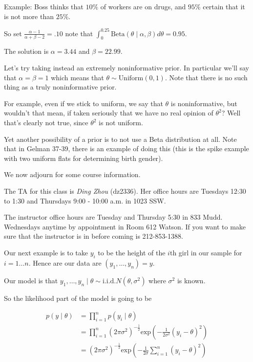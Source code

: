 \documentclass[a4paper]{article}
\begin{document}
Example: Boss thinks that $10\%$ of workers are on drugs, and $95\%$ certain that it is not more than $25\%$.

So set $\frac{\alpha - 1}{\alpha + \beta - 2} = .10$ note that $\int _0 ^{0.25} \text{Beta}(\theta \mid \alpha, \beta) d\theta = 0.95$.

The solution is $\alpha = 3.44$ and $\beta = 22.99$.

Let's try taking instead an extremely noninformative prior. In particular we'll
say that $\alpha = \beta = 1$ which means that $\theta \sim \text{Uniform}(0,
1)$. Note that there is no such thing as a truly noninformative prior.

For example, even if we stick to uniform, we say that $\theta$ is
noninformative, but wouldn't that mean, if taken seriously that we have no real
opinion of $\theta ^2$? Well that's clearly not true, since $\theta ^2$ is not
uniform. 

Yet another possibility of a prior is to not use a Beta distribution at all.
Note that in Gelman 37-39, there is an example of doing this (this is the spike
example with two uniform flats for determining birth gender).

We now adjourn for some course information.

The TA for this class is \emph{Ding Zhou} (dz2336). Her office hours are
Tuesdays 12:30 to 1:30 and Thursdays 9:00 - 10:00 a.m. in 1023 SSW.

The instructor office hours are Tuesday and Thursday 5:30 in 833 Mudd.
Wednesdays anytime by appointment in Room 612 Watson. If you want to make sure
that the instructor is in before coming is 212-853-1388.

Our next example is to take $y_i$ to be the height of the $i$th girl in our
sample for $i = 1 \ldots n$. Hence are our data are $\left( y_1, \ldots, y_n
\right) = y$.

Our model is that $y_1, \ldots, y_n \mid \theta \sim \text{i.i.d.} N\left(
\theta, \sigma ^2 \right)$ where $\sigma ^2$ is known.

So the likelihood part of the model is going to be 

\begin{align}
p \left( y \mid \theta \right) &= \prod _{i = 1} ^n p\left( y_i \mid \theta \right) \\
&= \prod _{i = 1} ^n \left( 2 \pi \sigma ^2 \right) ^{- \frac{1}{2}} \text{exp}\left( -\frac{1}{2 \sigma ^2} \left( y_i - \theta \right)^2 \right)\\
&= \left( 2 \pi \sigma ^2 \right) ^{- \frac{1}{2}} \text{exp}\left( - \frac{1}{2 \sigma} \sum _{i = 1} ^n \left( y _i - \theta \right) ^2 \right)\\
\end{align}
\end{document}
